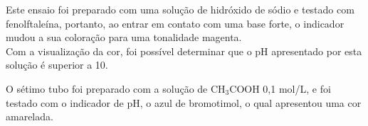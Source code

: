     	\indent Este ensaio foi preparado com uma solução de hidróxido de sódio e testado com fenolftaleína, portanto, ao entrar em contato com uma base forte, o indicador mudou a sua coloração para uma tonalidade magenta.\\
    	
    	\indent Com a visualização da cor, foi possível determinar que o pH apresentado por esta solução é superior a 10.

        \newpage

        \indent O sétimo tubo foi preparado com a solução de CH$_3$COOH 0,1 mol/L, e foi testado com o indicador de pH, o azul de bromotimol, o qual apresentou uma cor amarelada.

        \begin{figure}[h]
            \centering

\end{figure}
